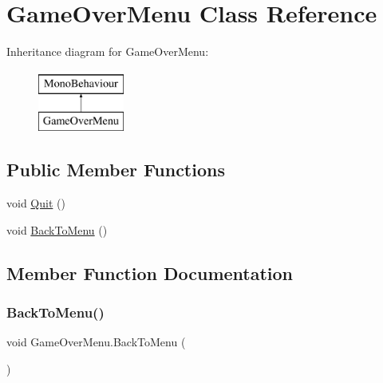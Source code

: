 \hypertarget{class_game_over_menu}{}\section{Game\+Over\+Menu Class Reference}
\label{class_game_over_menu}
Inheritance diagram for Game\+Over\+Menu\+:\begin{figure}[H]
\begin{center}
\leavevmode
\includegraphics[height=2.000000cm]{class_game_over_menu}
\end{center}
\end{figure}
\subsection*{Public Member Functions}
\begin{DoxyCompactItemize}
\item 
void \mbox{\hyperlink{class_game_over_menu_a36969d7db88de1b75335f869c154845f}{Quit}} ()
\item 
void \mbox{\hyperlink{class_game_over_menu_afb60baa9c7f427e2bcb0d708941e1dfc}{Back\+To\+Menu}} ()
\end{DoxyCompactItemize}


\subsection{Member Function Documentation}
\mbox{\label{class_game_over_menu_afb60baa9c7f427e2bcb0d708941e1dfc}} 
\subsubsection{\texorpdfstring{Back\+To\+Menu()}{BackToMenu()}}
{\footnotesize\ttfamily void Game\+Over\+Menu.\+Back\+To\+Menu (\begin{DoxyParamCaption}{ }\end{DoxyParamCaption})}

\mbox{\label{class_game_over_menu_a36969d7db88de1b75335f869c154845f}} 
